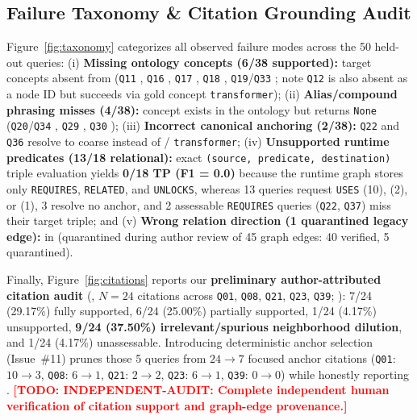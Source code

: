 \documentclass[sigconf]{acmart}
\DeclareRobustCommand{\todo}[1]{\textcolor{red}{\textbf{[TODO: #1]}}}
\begin{document}
\subsection{Failure Taxonomy \& Citation Grounding Audit}
Figure~\ref{fig:taxonomy} categorizes all observed failure modes across the 50
held-out queries:
(i) \textbf{Missing ontology concepts (6/38 supported):} target concepts absent from
 (\texttt{Q11} ,
\texttt{Q16} , \texttt{Q17} ,
\texttt{Q18} , \texttt{Q19}/\texttt{Q33} ;
note \texttt{Q12}  is also absent as a node ID but succeeds
via gold concept \texttt{transformer});
(ii) \textbf{Alias/compound phrasing misses (4/38):} concept exists in the ontology
but returns \texttt{None} (\texttt{Q20}/\texttt{Q34} ,
\texttt{Q29} , \texttt{Q30} );
(iii) \textbf{Incorrect canonical anchoring (2/38):} \texttt{Q22} and \texttt{Q36}
resolve to coarse  instead of  /
\texttt{transformer};
(iv) \textbf{Unsupported runtime predicates (13/18 relational):} exact
\texttt{(source, predicate, destination)} triple evaluation yields \textbf{0/18 TP
(F1 = 0.0)} because the runtime graph stores only \texttt{REQUIRES}, \texttt{RELATED},
and \texttt{UNLOCKS}, whereas 13 queries request \texttt{USES} (10),
 (2), or  (1), 3 resolve no anchor, and 2
assessable \texttt{REQUIRES} queries (\texttt{Q22}, \texttt{Q37}) miss their target triple;
and (v) \textbf{Wrong relation direction (1 quarantined legacy edge):}
 in 
(quarantined during author review of 45 graph edges: 40 verified, 5 quarantined).

Finally, Figure~\ref{fig:citations} reports our \textbf{preliminary author-attributed
citation audit} (, $N=24$ citations across
\texttt{Q01}, \texttt{Q08}, \texttt{Q21}, \texttt{Q23}, \texttt{Q39};
): 7/24 (29.17\%) fully supported, 6/24
(25.00\%) partially supported, 1/24 (4.17\%) unsupported, \textbf{9/24 (37.50\%)
irrelevant/spurious neighborhood dilution}, and 1/24 (4.17\%) unassessable. Introducing
deterministic anchor selection (Issue~\#11) prunes those 5 queries from $24 \rightarrow 7$
focused anchor citations (\texttt{Q01}: $10 \rightarrow 3$, \texttt{Q08}: $6 \rightarrow 1$,
\texttt{Q21}: $2 \rightarrow 2$, \texttt{Q23}: $6 \rightarrow 1$, \texttt{Q39}: $0 \rightarrow 0$)
while honestly reporting .
\todo{INDEPENDENT-AUDIT: Complete independent human verification of citation support
and graph-edge provenance.}
\end{document}
